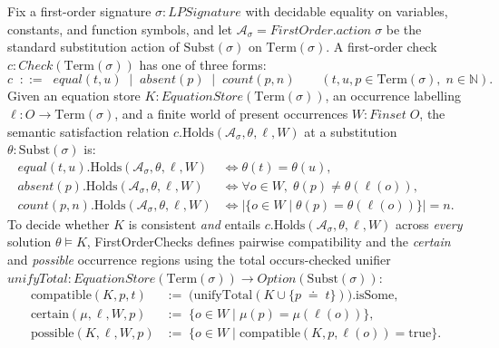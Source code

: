 \documentclass[11pt,a4paper]{article}
\theoremstyle{definition}
\DeclareRobustCommand{\lean}[1]{%
  \ifmmode\text{\normalfont\ttfamily\footnotesize\detokenize{#1}}%
  \else{\normalfont\footnotesize\leanurl{#1}}\fi}
\DeclareRobustCommand{\metta}[1]{\text{\normalfont\ttfamily\footnotesize #1}}
\def\lean#1{#1}%
\def\metta#1{#1}%
\newcommand{\doteqStore}{\;\doteq\;}
\begin{document}
Fix a first-order signature $\sigma : \lean{LPSignature}$ with decidable equality on variables, constants, and function symbols, and let $\mathcal{A}_\sigma = \lean{FirstOrder.action}\;\sigma$ be the standard substitution action of $\mathrm{Subst}(\sigma)$ on $\mathrm{Term}(\sigma)$. A first-order check $c : \lean{Check}(\mathrm{Term}(\sigma))$ has one of three forms:
\[
  c \;\;::=\;\; \metta{equal}(t, u) \;\mid\; \metta{absent}(p) \;\mid\; \metta{count}(p, n)
  \qquad (t, u, p \in \mathrm{Term}(\sigma),\; n \in \mathbb{N}).
\]
Given an equation store $K : \lean{EquationStore}(\mathrm{Term}(\sigma))$, an occurrence labelling $\ell : O \to \mathrm{Term}(\sigma)$, and a finite world of present occurrences $W : \lean{Finset}\;O$, the semantic satisfaction relation $c.\mathrm{Holds}(\mathcal{A}_\sigma, \theta, \ell, W)$ at a substitution $\theta : \mathrm{Subst}(\sigma)$ is:
\begin{align*}
  \metta{equal}(t, u).\mathrm{Holds}(\mathcal{A}_\sigma, \theta, \ell, W) &\iff \theta(t) = \theta(u), \\
  \metta{absent}(p).\mathrm{Holds}(\mathcal{A}_\sigma, \theta, \ell, W) &\iff \forall o \in W,\; \theta(p) \neq \theta(\ell(o)), \\
  \metta{count}(p, n).\mathrm{Holds}(\mathcal{A}_\sigma, \theta, \ell, W) &\iff \big|\{o \in W \mid \theta(p) = \theta(\ell(o))\}\big| = n.
\end{align*}
To decide whether $K$ is consistent \emph{and} entails $c.\mathrm{Holds}(\mathcal{A}_\sigma, \theta, \ell, W)$ across \emph{every} solution $\theta \models K$, \lean{FirstOrderChecks} defines pairwise compatibility and the \emph{certain} and \emph{possible} occurrence regions using the total occurs-checked unifier $\lean{unifyTotal} : \lean{EquationStore}(\mathrm{Term}(\sigma)) \to \lean{Option}(\mathrm{Subst}(\sigma))$:
\begin{align}
  \mathrm{compatible}(K, p, t) &:=\; \big(\mathrm{unifyTotal}(K \cup \{p \doteqStore t\})\big).\mathrm{isSome}, \label{eq:compatible}\\
  \mathrm{certain}(\mu, \ell, W, p) &:=\; \{o \in W \mid \mu(p) = \mu(\ell(o))\}, \label{eq:certain-region}\\
  \mathrm{possible}(K, \ell, W, p) &:=\; \{o \in W \mid \mathrm{compatible}(K, p, \ell(o)) = \mathrm{true}\}. \label{eq:possible-region}
\end{align}
\end{document}
